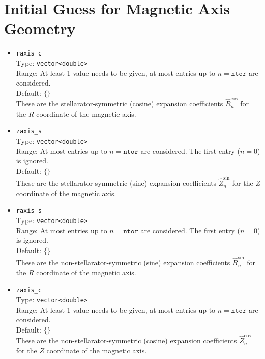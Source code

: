 \section{Initial Guess for Magnetic Axis Geometry}

\begin{itemize}

 \item \texttt{raxis\_c} \\
       Type: \texttt{vector<double>} \\
       Range: At least 1 value needs to be given, at most entries up to $n = \texttt{ntor}$ are considered. \\
       Default: $\{ \}$ \\
       These are the stellarator-symmetric (cosine) expansion coefficients $\hat{R}_{n}^{\cos}$ for the $R$ coordinate of the magnetic axis.

 \item \texttt{zaxis\_s} \\
       Type: \texttt{vector<double>} \\
       Range: At most entries up to $n = \texttt{ntor}$ are considered. The first entry ($n = 0$) is ignored. \\
       Default: $\{ \}$ \\
       These are the stellarator-symmetric (sine) expansion coefficients $\hat{Z}_{n}^{\sin}$ for the $Z$ coordinate of the magnetic axis.

 \item \texttt{raxis\_s} \\
       Type: \texttt{vector<double>} \\
       Range: At most entries up to $n = \texttt{ntor}$ are considered. The first entry ($n = 0$) is ignored. \\
       Default: $\{ \}$ \\
       These are the non-stellarator-symmetric (sine) expansion coefficients $\hat{R}_{n}^{\sin}$ for the $R$ coordinate of the magnetic axis.

 \item \texttt{zaxis\_c} \\
       Type: \texttt{vector<double>} \\
       Range: At least 1 value needs to be given, at most entries up to $n = \texttt{ntor}$ are considered. \\
       Default: $\{ \}$ \\
       These are the non-stellarator-symmetric (cosine) expansion coefficients $\hat{Z}_{n}^{\cos}$ for the $Z$ coordinate of the magnetic axis.

\end{itemize}

